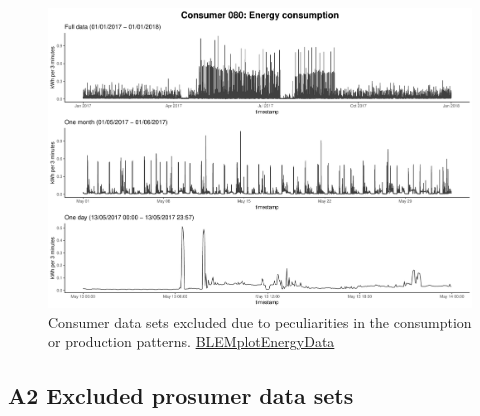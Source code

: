 \begin{centering}
\begin{figure}[!htbp]
        \includegraphics[width=\textwidth-0.85cm]{thesis/graphs/timeseries/c080_cons.pdf}
        \caption[Consumer data sets excluded due to peculiarities in the consumption patterns]{Consumer data sets excluded due to peculiarities in the consumption or production patterns. \quantnet\href{https://github.com/QuantLet/BLEM/tree/master/BLEMplotEnergyData}{BLEMplotEnergyData}}
\end{figure}
\end{centering}


\subsection*{\hypertarget{AppA2:Figures:Excludedp}{A2} Excluded prosumer data sets}\label{AppA2:Figures:Excludedp}

